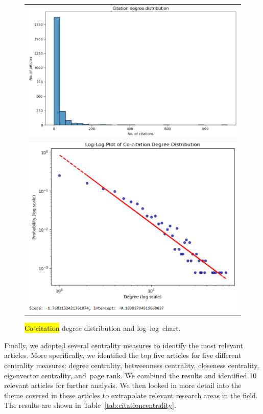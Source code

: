 \documentclass[jmse,review,accept,pdftex,moreauthors]{Definitions/mdpi}
\begin{document}
\begin{figure}[H]
\begin{tabular}{c}
	\includegraphics[height=0.33\textheight, keepaspectratio]{pics/citation_degree_distribution.eps}\\
	\includegraphics[height=0.4\textheight, keepaspectratio]{pics/loglog_citation_degree_distribution.eps}\\
		\end{tabular}
	\caption{\hl{Co-citation} %
 degree distribution and log--log~chart.} \label{fig:fig8}
\end{figure}


Finally, we adopted several centrality measures to identify the most relevant articles. More specifically, we identified the top five articles for five different centrality measures: degree centrality, betweenness centrality, closeness centrality, eigenvector centrality, and~page rank. We combined the results and identified 10 relevant articles for further analysis. We then looked in more detail into the theme covered in these articles to extrapolate relevant research areas in the field. The results are shown in Table~\ref{tab:citationcentrality}.
\end{document}
